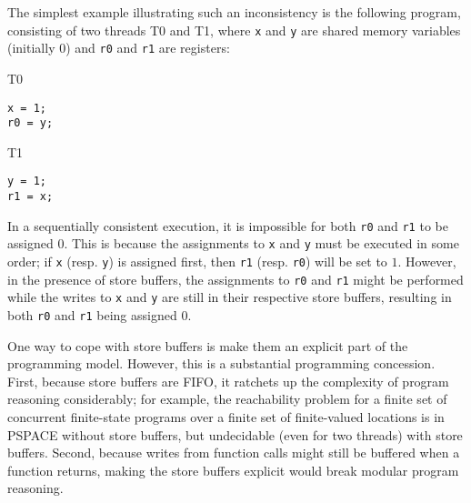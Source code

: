 \documentclass[11pt]{llncs}
\begin{document}
The simplest example illustrating such an inconsistency is the
following program, consisting of two threads T0 and T1, where
\texttt{x} and \texttt{y} are shared memory variables (initially 0)
and \texttt{r0} and \texttt{r1} are registers:
%
\begin{center}
\begin{minipage}{6cm}
\begin{multicols}{3}
T0
\begin{verbatim}
x = 1;
r0 = y;
\end{verbatim}

\columnbreak 

T1
\begin{verbatim}
y = 1;
r1 = x;
\end{verbatim}
\columnbreak 

\end{multicols}
\end{minipage}
\end{center}
%
In a sequentially consistent execution, it is impossible for both
\texttt{r0} and \texttt{r1} to be assigned $0$. This is because the
assignments to \texttt{x} and \texttt{y} must be executed in some
order; if \texttt{x} (resp. \texttt{y}) is assigned first, then
\texttt{r1} (resp. \texttt{r0}) will be set to $1$. However, in the
presence of store buffers, the assignments to \texttt{r0} and
\texttt{r1} might be performed while the writes to \texttt{x} and
\texttt{y} are still in their respective store buffers, resulting in
both \texttt{r0} and \texttt{r1} being assigned $0$.

One way to cope with store buffers is make them an explicit part of
the programming model. However, this is a substantial programming
concession. First, because store buffers are FIFO, it ratchets up the
complexity of program reasoning considerably; for example, the
reachability problem for a finite set of concurrent finite-state
programs over a finite set of finite-valued locations is in PSPACE
without store buffers, but undecidable (even for two threads) with
store buffers. Second, because writes from function calls might still
be buffered when a function returns, making the store buffers explicit
would break modular program reasoning.
\end{document}
